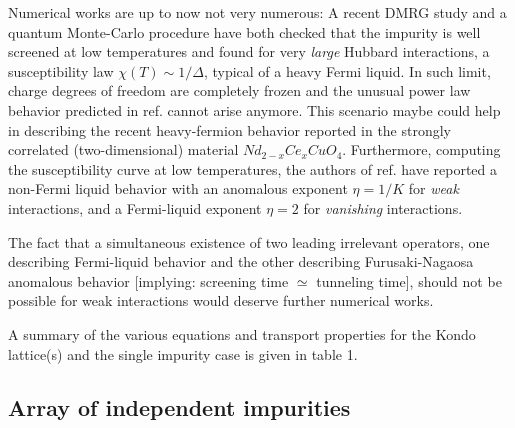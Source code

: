 Numerical works are up to now not very numerous:
A recent DMRG study\cite{Wang}
and a quantum Monte-Carlo procedure\cite{Komnik} have both
checked that the impurity is well screened at low temperatures
and found for very {\it large} Hubbard interactions,
a susceptibility law $\chi(T)\sim 1/\Delta$, typical
of a heavy Fermi liquid. In such
limit, charge degrees of freedom are completely frozen and the
unusual power law behavior predicted in ref.\cite{Furusaki,KLH} cannot
arise anymore. This scenario maybe
could help in describing
the recent heavy-fermion behavior reported in the strongly correlated
(two-dimensional) material $Nd_{2-x}Ce_xCuO_4$\cite{Brugger}.
Furthermore, computing the susceptibility curve
at low temperatures, the authors of ref.\cite{Komnik} have reported a
non-Fermi liquid behavior with an anomalous exponent 
$\eta=1/K$\cite{Furusaki,remark4} for {\it weak} 
interactions, and a Fermi-liquid
exponent $\eta=2$ for {\it vanishing} interactions.

The fact that a simultaneous existence
of two leading irrelevant operators, one describing
Fermi-liquid behavior and the other describing Furusaki-Nagaosa anomalous
behavior [implying: screening time $\simeq$ tunneling time], should not be possible for weak interactions would deserve 
further numerical works.

A summary of the various equations and transport properties for the Kondo
lattice(s) and the single impurity case
is given in table 1.

\subsection{Array of independent impurities}

